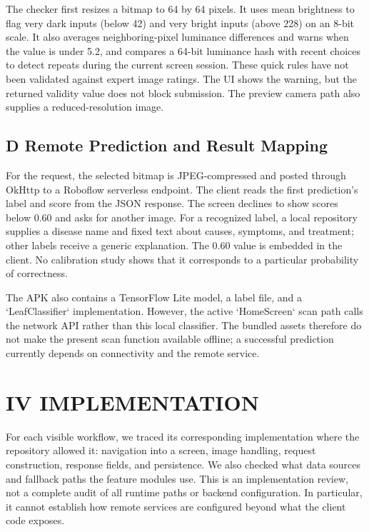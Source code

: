 \documentclass[conference]{IEEEtran}
\begin{document}
The checker first resizes a bitmap to 64 by 64 pixels. It uses mean brightness to flag very dark inputs (below 42) and very bright inputs (above 228) on an 8-bit scale. It also averages neighboring-pixel luminance differences and warns when the value is under 5.2, and compares a 64-bit luminance hash with recent choices to detect repeats during the current screen session. These quick rules have not been validated against expert image ratings. The UI shows the warning, but the returned validity value does not block submission. The preview camera path also supplies a reduced-resolution image.

\subsection*{D Remote Prediction and Result Mapping}

For the request, the selected bitmap is JPEG-compressed and posted through OkHttp to a Roboflow serverless endpoint. The client reads the first prediction's label and score from the JSON response. The screen declines to show scores below 0.60 and asks for another image. For a recognized label, a local repository supplies a disease name and fixed text about causes, symptoms, and treatment; other labels receive a generic explanation. The 0.60 value is embedded in the client. No calibration study shows that it corresponds to a particular probability of correctness.

The APK also contains a TensorFlow Lite model, a label file, and a `LeafClassifier` implementation. However, the active `HomeScreen` scan path calls the network API rather than this local classifier. The bundled assets therefore do not make the present scan function available offline; a successful prediction currently depends on connectivity and the remote service.

\section*{IV IMPLEMENTATION}

For each visible workflow, we traced its corresponding implementation where the repository allowed it: navigation into a screen, image handling, request construction, response fields, and persistence. We also checked what data sources and fallback paths the feature modules use. This is an implementation review, not a complete audit of all runtime paths or backend configuration. In particular, it cannot establish how remote services are configured beyond what the client code exposes.
\end{document}
